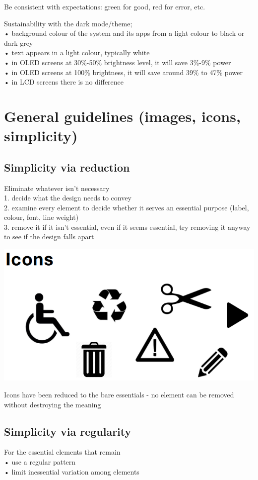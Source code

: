 \documentclass[]{project_plan}
\begin{document}
Be consistent with expectations: green for good, red for error, etc.

Sustainability with the dark mode/theme;\\
• background colour of the system and its apps from a light colour to black or dark grey\\
• text appears in a light colour, typically white\\
• in OLED screens at 30\%-50\% brightness level, it will save 3\%-9\% power\\
• in OLED screens at 100\% brightness, it will save around 39\% to 47\% power\\
• in LCD screens there is no difference

\section{General guidelines (images, icons, simplicity)}

\subsection{Simplicity via reduction}

Eliminate whatever isn’t necessary\\
1. decide what the design needs to convey\\
2. examine every element to decide whether it serves an essential purpose (label, colour, font, line weight)\\
3. remove it if it isn’t essential, even if it seems essential, try removing it anyway to see if the design falls apart

\includegraphics[width=0.5\linewidth]{graphic_design_reduction_icons.png}

Icons have been reduced to the bare essentials - no element can be removed
without destroying the meaning

\subsection{Simplicity via regularity}

For the essential elements that remain\\
• use a regular pattern\\
• limit inessential variation among elements
\end{document}
